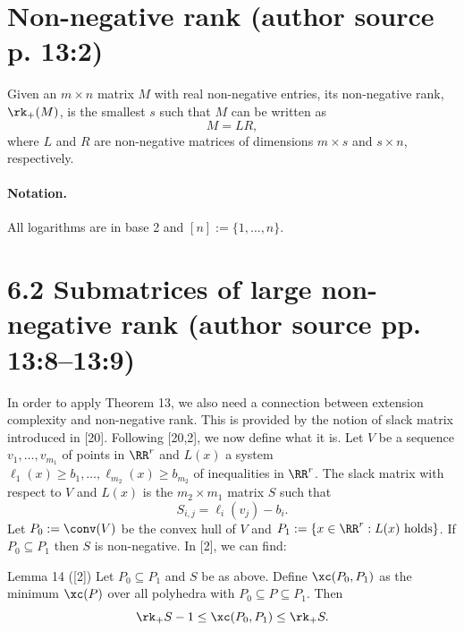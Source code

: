 \section*{Non-negative rank (author source p. 13:2)}
Given an $m\times n$ matrix $M$ with real non-negative entries, its non-negative rank, $\rk_+(M)$, is the smallest $s$ such that $M$ can be written as
\[M=LR,\]
where $L$ and $R$ are non-negative matrices of dimensions $m\times s$ and $s\times n$, respectively.
\paragraph{Notation.} All logarithms are in base 2 and $[n]:=\{1,\ldots,n\}$.
\section*{6.2 Submatrices of large non-negative rank (author source pp. 13:8--13:9)}
In order to apply Theorem 13, we also need a connection between extension complexity and non-negative rank. This is provided by the notion of slack matrix introduced in [20]. Following [20,2], we now define what it is. Let $V$ be a sequence $v_1,\ldots,v_{m_1}$ of points in $\RR^r$ and $L(x)$ a system $\ell_1(x)\ge b_1,\ldots,\ell_{m_2}(x)\ge b_{m_2}$ of inequalities in $\RR^r$. The slack matrix with respect to $V$ and $L(x)$ is the $m_2\times m_1$ matrix $S$ such that
\[S_{i,j}=\ell_i(v_j)-b_i.\]
Let $P_0:=\conv(V)$ be the convex hull of $V$ and $P_1:=\{x\in\RR^r:L(x)\text{ holds}\}$. If $P_0\subseteq P_1$ then $S$ is non-negative. In [2], we can find:
\begin{originalresult}{Lemma 14 ([2])}
Let $P_0\subseteq P_1$ and $S$ be as above. Define $\xc(P_0,P_1)$ as the minimum $\xc(P)$ over all polyhedra with $P_0\subseteq P\subseteq P_1$. Then
\[\rk_+S-1\le\xc(P_0,P_1)\le\rk_+S.\]
\end{originalresult}

